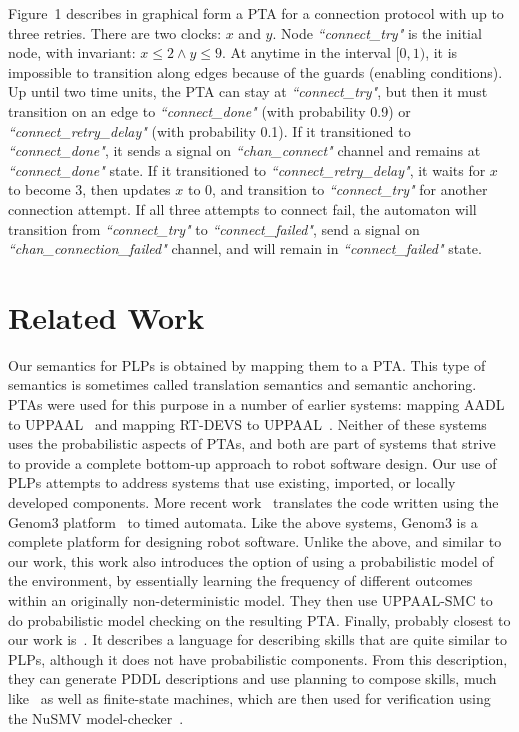 \documentclass[letterpaper]{article}
\newcommand{\frameImage}[4]{
\begin{figure}[H] 
  \centerline{
    \fcolorbox{frameColor}{white}{
        \texttt{[image: \#1]} } }
    \caption{#4}
    \label{fig:#1}
\end{figure}
}
\begin{document}
Figure~1 describes in graphical form a PTA for a connection protocol with up to three retries.
There are two clocks: $x$ and $y$. Node \textit{``connect\_try"} is the initial node, with invariant: $x\leq 2\wedge y \leq 9$. At anytime in the interval $\big[0,1\big)$, it is impossible to transition along edges because of the guards (enabling conditions). Up until two time units, the PTA can stay at \textit{``connect\_try"}, but then it must transition on an edge to \textit{``connect\_done"} (with probability 0.9) or \textit{``connect\_retry\_delay"} (with probability 0.1). If it transitioned to \textit{``connect\_done"}, it sends a signal on \textit{``chan\_connect"} channel and remains at \textit{``connect\_done"} state. If it transitioned to \textit{``connect\_retry\_delay"}, it waits for $x$ to become 3, then updates $x$ to 0, and transition to \textit{``connect\_try"} for another connection attempt. If all three attempts to connect fail, the automaton will transition from  \textit{``connect\_try"} to \textit{``connect\_failed"}, send a signal on \textit{``chan\_connection\_failed"} channel, and will remain in \textit{``connect\_failed"} state.





\section{Related Work}
Our semantics for PLPs is obtained by mapping them to a PTA. This type of semantics is sometimes called translation semantics and semantic anchoring. PTAs were used for this purpose in a number of earlier systems: mapping AADL to UPPAAL~\citep{JLPJ12} and mapping RT-DEVS to UPPAAL~\citep{FN08}. Neither of these systems uses the probabilistic aspects of PTAs, and both are part of systems that strive to provide a complete bottom-up approach to robot software design. Our use of PLPs attempts to address systems that use existing, imported, or locally developed components. 
More recent work~\cite{FoughaliIS19} translates the code written using the Genom3 platform~\citep{Genom} to timed automata. Like the above systems, Genom3 is a complete platform for
designing robot software. Unlike the above, and similar to our work, this work also introduces the option of using
a probabilistic model of the environment, by essentially learning the frequency of different outcomes within an
originally non-deterministic model. They then use UPPAAL-SMC to do probabilistic
model checking on the resulting PTA. Finally, probably closest to our work is~\cite{Lesire20}.
It describes a language for describing skills that are quite similar to PLPs, although it does not have probabilistic components. 
From this description, they can generate PDDL descriptions and use planning to compose skills, much like~\cite{PlanRob16} as well as finite-state machines, which  are then used for verification using the
NuSMV model-checker~\citep{NuSMV}.
\end{document}
